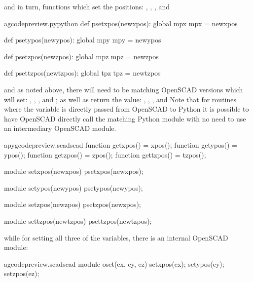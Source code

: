 \documentclass{ltxdoc}
\begin{document}
\noindent and in turn, functions which set the positions: 
,
,
, and

\lstset{firstnumber=\thegcpy}
\begin{writecode}{a}{gcodepreview.py}{python}
def psetxpos(newxpos):
    global mpx
    mpx = newxpos

def psetypos(newypos):
    global mpy
    mpy = newypos

def psetzpos(newzpos):
    global mpz
    mpz = newzpos
 
def psettzpos(newtzpos):
    global tpz
    tpz = newtzpos

\end{writecode}
\addtocounter{gcpy}{16}
 
\noindent and as noted above, there will need to be matching OpenSCAD versions which will 
set: , , , and
; as well as return the value: , , , and  
Note that for routines where the variable is directly passed from OpenSCAD to Python
it is possible to have OpenSCAD directly call the matching Python module with no need
to use an intermediary OpenSCAD module.
 
\lstset{firstnumber=\thepyscad}
\begin{writecode}{a}{pygcodepreview.scad}{scad}
function getxpos() = xpos();
function getypos() = ypos();
function getzpos() = zpos();
function gettzpos() = tzpos();

module setxpos(newxpos) {
    psetxpos(newxpos);
}

module setypos(newypos) {
    psetypos(newypos);
}

module setzpos(newzpos) {
    psetzpos(newzpos);
}

module settzpos(newtzpos) {
    psettzpos(newtzpos);
}

\end{writecode}
\addtocounter{pyscad}{21}
 
\noindent{} while for setting all three of the variables, there is
an internal OpenSCAD module:

\lstset{firstnumber=\thegcpscad}
\begin{writecode}{a}{gcodepreview.scad}{scad}
module oset(ex, ey, ez) {
    setxpos(ex);
    setypos(ey);
    setzpos(ez);
}

\end{writecode}
\addtocounter{gcpscad}{6}
 
\end{document}
